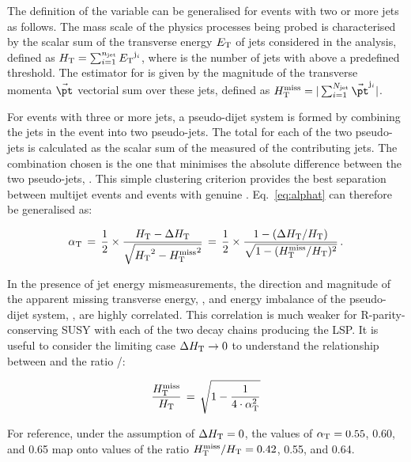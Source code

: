 The definition of the \alphat variable can be generalised for events with two or more jets as follows. The mass scale of the physics
processes being probed is characterised by the scalar sum of the transverse energy ${E_{\text T}}$ of jets considered in the analysis, defined as
$\mbox{$H_\text{T}$} = \sum_{i=1}^{n_{\text{jet}}} {E_{\text T}}^{{\rm j}_i}$, where \njet is the number of jets with \Et above a predefined threshold. The estimator
for \met is given by the magnitude of the transverse momenta $\vec{\pt}$ vectorial sum over these jets, defined as $\mht =
|\sum_{i=1}^{N_{\rm jet}} \vec{\pt}^{{\rm j}_i}|$. 

For events with three or more jets, a pseudo-dijet system is formed by combining the jets in the event into two pseudo-jets. The total \Et
for each of the two pseudo-jets is calculated as the scalar sum of the measured \Et of the contributing jets. The combination chosen is the
one that minimises the absolute \Et difference between the two pseudo-jets, \dht. This simple clustering criterion provides the best
separation between multijet events and events with genuine \met. Eq.~\ref{eq:alphat} can therefore be generalised as:

\begin{equation}
  \label{eq:alphat2}
  \alpha_{\text{T}}\, = \,\frac{1}{2} \times \frac{\mbox{$H_\text{T}$} -
    \Delta\mbox{$H_\text{T}$}}{\sqrt{\mbox{$H_\text{T}$}^2 - \mbox{$H_{\rm T}^{\rm miss}$}^2}} \, = \,\frac{1}{2} \times 
  \frac{1 - (\Delta\mbox{$H_\text{T}$}/\mbox{$H_\text{T}$})}{\sqrt{1 - (\mbox{$H_{\rm T}^{\rm miss}$}/\mbox{$H_\text{T}$})^2}} \, . 
\end{equation}

In the presence of jet energy mismeasurements, the direction and magnitude of the apparent missing transverse energy, \mht, and energy
imbalance of the pseudo-dijet system, \dht, are highly correlated. This correlation is much weaker for R-parity-conserving SUSY with each
of the two decay chains producing the LSP. It is useful to consider the limiting case $\Delta\mbox{$H_\text{T}$} \rightarrow 0$ to
understand the relationship between \alphat and the ratio \mht/\scalht:

\begin{equation}
  \label{eq:alphat3}
  \frac{\mbox{$H_{\rm T}^{\rm miss}$}}{\mbox{$H_\text{T}$}} \, = \, \sqrt{ 1 - \frac{1}{4 \cdot \alpha_{\text{T}}^2} }
\end{equation}

For reference, under the assumption of $\Delta\mbox{$H_\text{T}$} = 0$, the values of
$\alpha_{\text{T}} = 0.55$, 0.60, and 0.65 map onto values of the ratio
$\mbox{$H_{\rm T}^{\rm miss}$}/\mbox{$H_\text{T}$} = 0.42$, 0.55, and 0.64.

